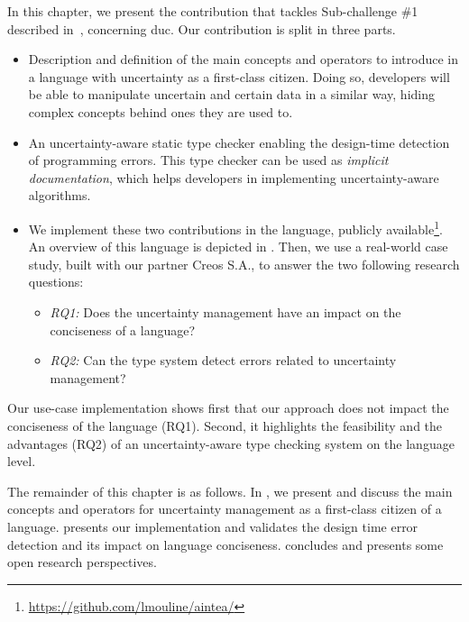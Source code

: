In this chapter, we present the contribution that tackles Sub-challenge \#1 described in~, concerning \gls{duc}.
Our contribution is split in three parts.
\begin{itemize}
	\vspace{-0.5em}
	\setlength\itemsep{-0.3em}
    \item Description and definition of the main concepts and operators to introduce in a language with uncertainty as a first-class citizen. Doing so, developers will be able to manipulate uncertain and certain data in a similar way, hiding complex concepts behind ones they are used to. 
    \item An uncertainty-aware static type checker enabling the design-time detection of programming errors. This type checker can be used as \textit{implicit documentation}, which helps developers in implementing uncertainty-aware algorithms.
    \item We implement these two contributions in the \langName{} language, publicly available\footnote{\url{https://github.com/lmouline/aintea/}}. An overview of this language is depicted in . Then, we use a real-world case study, built with our partner Creos S.A., to answer the two following research questions: 
    \begin{itemize}
   		\vspace{-0.5em}
		\setlength\itemsep{-0.3em}
    	\item \textit{RQ1:} Does the uncertainty management have an impact on the conciseness of a language? 
		\item \textit{RQ2:} Can the type system detect errors related to uncertainty management?
    \end{itemize}
\end{itemize}

Our use-case implementation shows first that our approach does not impact the conciseness of the language (RQ1).
Second, it highlights the feasibility and the advantages (RQ2) of an uncertainty-aware type checking system on the language level.

The remainder of this chapter is as follows.
In , we present and discuss the main concepts and operators for uncertainty management as a first-class citizen of a language. 
 presents our \langName{} implementation and validates the design time error detection and its impact on language conciseness. 
 concludes and presents some open research perspectives. 

\vfill